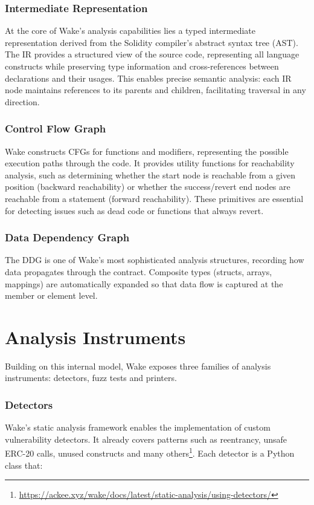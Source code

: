 \subsubsection*{Intermediate Representation}
At the core of Wake's analysis capabilities lies a typed intermediate representation derived from the Solidity compiler's abstract syntax tree (AST). The IR provides a structured view of the source code, representing all language constructs while preserving type information and cross-references between declarations and their usages. This enables precise semantic analysis: each IR node maintains references to its parents and children, facilitating traversal in any direction.

\subsubsection*{Control Flow Graph}
Wake constructs CFGs for functions and modifiers, representing the possible execution paths through the code. It provides utility functions for reachability analysis, such as determining whether the start node is reachable from a given position (backward reachability) or whether the success/revert end nodes are reachable from a statement (forward reachability). These primitives are essential for detecting issues such as dead code or functions that always revert.

\subsubsection*{Data Dependency Graph}
The DDG is one of Wake's most sophisticated analysis structures, recording how data propagates through the contract. Composite types (structs, arrays, mappings) are automatically expanded so that data flow is captured at the member or element level.

\section{Analysis Instruments}
\label{sec:wake-analysis}

Building on this internal model, Wake exposes three families of analysis instruments: detectors, fuzz tests and printers.

\subsubsection*{Detectors}
Wake's static analysis framework enables the implementation of custom vulnerability detectors. It already covers patterns such as reentrancy, unsafe ERC-20 calls, unused constructs and many others\footnote{\url{https://ackee.xyz/wake/docs/latest/static-analysis/using-detectors/}}. Each detector is a Python class that:


